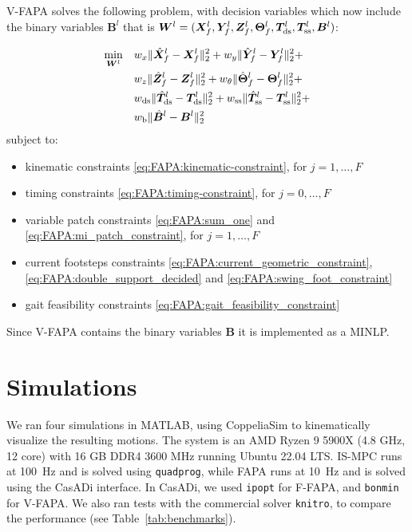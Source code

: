 V-FAPA solves the following problem, with decision variables which now include the binary variables $\bm{B}^{l}$ that is ${\bm{W}}^l = (\bm{X}_f^l, \bm{Y}_f^l, \bm{Z}_f^l, \bm{\Theta}_f^l, \bm{T}_{\rm ds}^l, \bm{T}_{\rm ss}^l, \bm{B}^{l})$:
\begin{braced}
\begin{equation*}\begin{split}
\min_{{\bm{W}}^l} \quad
& w_x \| \hat{\bm{X}}_f^l - \bm{X}_f^l \|_2^2 + w_y \| \hat{\bm{Y}}_f^l - \bm{Y}_f^l \|_2^2 + \\& w_z \| \hat{\bm{Z}}_f^l - \bm{Z}_f^l \|_2^2 + w_{\theta} \| \hat{\bm{\Theta}}_f^l - \bm{\Theta}_f^l \|_2^2 + \\& w_{\rm ds} \| \hat{\bm{T}}_{\rm ds}^l - \bm{T}_{\rm ds}^l \|_2^2 + w_{\rm ss} \| \hat{\bm{T}}_{\rm ss}^l - \bm{T}_{\rm ss}^l \|_2^2 +  \\&
w_{\rm b} \| \hat{\bm{B}}^l - \bm{B}^l \|_2^2
\end{split}\end{equation*}
\hspace{0.25cm} subject to:
\begin{itemize}
\item kinematic constraints \eqref{eq:FAPA:kinematic-constraint}, for $j=1,\dots,F$
\item timing constraints \eqref{eq:FAPA:timing-constraint}, for $j=0,\dots,F$
\item variable patch constraints \eqref{eq:FAPA:sum_one} and \eqref{eq:FAPA:mi_patch_constraint}, for $j=1,\dots,F$
\item current footsteps constraints \eqref{eq:FAPA:current_geometric_constraint}, \eqref{eq:FAPA:double_support_decided} and \eqref{eq:FAPA:swing_foot_constraint}
\item gait feasibility constraints \eqref{eq:FAPA:gait_feasibility_constraint}
\end{itemize}
\end{braced}

\medskip

Since V-FAPA contains the binary variables $\bm{B}$ it is implemented as a MINLP. %

\section{Simulations}
\label{sec:FAPA:Simulations}
We ran four simulations in MATLAB, using CoppeliaSim to kinematically visualize the resulting motions. The system is an AMD Ryzen 9 5900X (4.8 GHz, 12 core) with 16 GB DDR4 3600 MHz running Ubuntu 22.04 LTS. IS-MPC runs at 100~Hz and is solved using \texttt{quadprog}, while FAPA runs at 10~Hz and is solved using the CasADi interface. In CasADi, we used \texttt{ipopt} for F-FAPA, and \texttt{bonmin} for V-FAPA. We also ran tests with the commercial solver \texttt{knitro}, to compare the performance (see Table~\ref{tab:benchmarks}).

